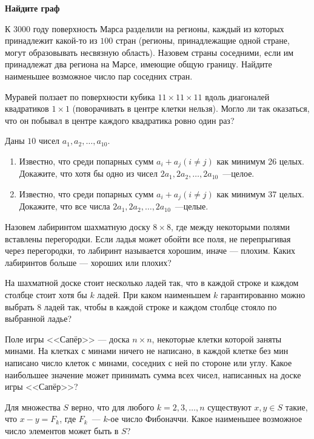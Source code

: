 \documentclass{article}
\begin{document}
    \large

    \begin{center}
        \textbf{Найдите граф}
    \end{center}

    \begin{enumerate_boxed}
        \item К 3000 году поверхность Марса разделили на регионы, каждый из которых принадлежит какой-то из $100$ стран (регионы, принадлежащие одной стране, могут образовывать несвязную область).
        Назовем страны соседними, если им принадлежат два региона на Марсе, имеющие общую границу.
        Найдите наименьшее возможное число пар соседних стран.


        \item Муравей ползает по поверхности кубика $11 \times 11 \times 11$ вдоль диагоналей квадратиков $1 \times 1$ (поворачивать в центре клетки нельзя).
        Могло ли так оказаться, что он побывал в центре каждого квадратика ровно один раз?


        \item Даны $10$ чисел $a_1,a_2,\dots,a_{10}.$

        \begin{enumerate}
            \item Известно, что среди попарных сумм $a_i + a_j (i \neq j)$ как минимум 26 целых.
            Докажите, что хотя бы одно из чисел $2a_1,2a_2,\ldots,2a_{10}$~---целое.
            \item Известно, что среди попарных сумм $a_i + a_j (i \neq j)$ как минимум 37 целых.
            Докажите, что все числа $2a_1,2a_2,\ldots,2a_{10}$~---целые.
        \end{enumerate}

        \item Назовем лабиринтом шахматную доску $8 \times 8$, где между некоторыми полями вставлены перегородки.
        Если ладья может обойти все поля, не перепрыгивая через перегородки, то лабиринт называется
        хорошим, иначе — плохим.
        Каких лабиринтов больше — хороших или плохих?


        \item На шахматной доске стоит несколько ладей так, что в каждой строке и каждом столбце стоит хотя бы $k$ ладей.
        При каком наименьшем $k$ гарантированно можно выбрать $8$ ладей так, чтобы в каждой строке и каждом столбце стояло по выбранной ладье?


        \item Поле игры <<Сапёр>> — доска $n \times n$, некоторые клетки которой заняты минами.
        На клетках с минами ничего не написано, в каждой клетке без мин написано число клеток с минами, соседних с ней по стороне или углу.
        Какое наибольшее значение может принимать сумма всех чисел, написанных на доске игры <<Сапёр>>?


        \item Для множества $S$ верно, что для любого $k = 2, 3, \dots , n$ существуют $x, y \in S$ такие, что $x - y = F_k$,
        где $F_k$~--- $k$-ое число Фибоначчи.
        Какое наименьшее возможное число элементов может быть в $S$?


    \end{enumerate_boxed}
\end{document}
